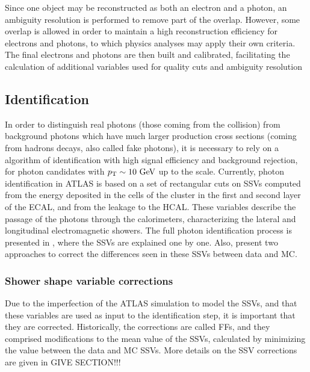 Since one object may be reconstructed as both an electron and a photon, an ambiguity resolution is performed to remove part of the overlap. However, some overlap is allowed in order to maintain a high reconstruction efficiency for electrons and photons, to which physics analyses may apply their own criteria. The final electrons and photons are then built and calibrated, facilitating the calculation of additional variables used for quality cuts and ambiguity resolution



\subsection{Identification}
\label{subsec:objects:egamma:id}

In order to distinguish real photons (those coming from the collision) from background photons which have much larger production cross sections (coming from hadrons decays, also called fake photons), it is necessary to rely on a algorithm of identification with high signal efficiency and background rejection, for photon candidates with \(p_{\text{T}} \sim 10~\text{GeV}\) up to the \tev scale. 
Currently, photon identification in ATLAS is based on a set of rectangular cuts on \acp{SSV} computed from the energy deposited in the cells of the cluster in the first and second layer of the \ac{ECAL}, and from the leakage to the \ac{HCAL}. These variables describe the passage of the photons through the calorimeters, characterizing the lateral and longitudinal electromagnetic showers.
The full photon identification process is presented in \Ch{\ref{ch:pid_ss}}, where the \acp{SSV} are explained one by one. Also, \Chs{\ref{ch:ffs}}{\ref{ch:cellrw}} present two approaches to correct the differences seen in these \acp{SSV} between data and \ac{MC}.



\subsubsection{Shower shape variable corrections}

Due to the imperfection of the \ac{ATLAS} simulation to model the \acp{SSV}, and that these variables are used as input to the identification step, it is important that they are corrected. Historically, the corrections are called \acp{FF}, and they comprised modifications to the mean value of the \acp{SSV}, calculated by minimizing the \chisq value between the data and \ac{MC} \acp{SSV}.
More details on the \ac{SSV} corrections are given in GIVE SECTION!!!

